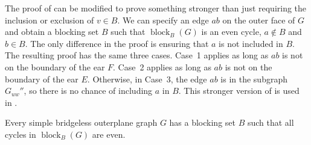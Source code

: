 \documentclass{patmorin}
\DeclareMathOperator{\block}{block}
\begin{document}
\begin{rem}
   The proof of  can be modified to prove
   something stronger than just requiring the inclusion or exclusion
   of $v\in B$.  We can specify an edge $ab$ on the outer face of $G$
   and obtain a blocking set $B$ such that $\block_B(G)$ is an even
   cycle, $a\not\in B$ and $b\in B$.  The only difference in the proof
   is ensuring that $a$ is not included in $B$. The resulting proof
   has the same three cases. Case~1 applies as long as $ab$ is not on
   the boundary of the ear $F$. Case~2 applies as long as $ab$ is not
   on the boundary of the ear $E$.  Otherwise, in Case~3, the edge $ab$
   is in the subgraph $G_{uw}''$, so there is no chance of including $a$
   in $B$.  This stronger version of  is used
   in .
\end{rem}

\begin{lem}
  Every simple bridgeless outerplane graph $G$ has a blocking set $B$
  such that all cycles in $\block_B(G)$ are even.
\end{lem}
\end{document}
